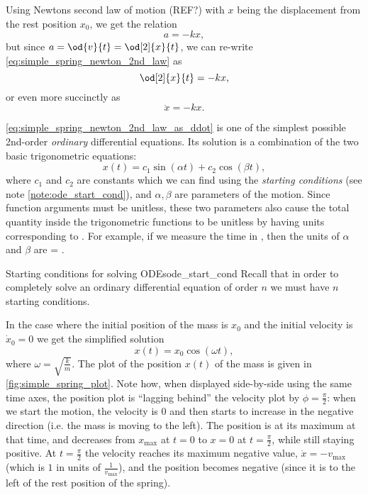 Using Newtons second law of motion (REF?) with $x$ being the displacement from the rest position $x_{0}$, we get the relation
\begin{equation}
  a = -kx,
  \label{eq:simple_spring_newton_2nd_law}
\end{equation}
but since $a = \od{v}{t} = \od[2]{x}{t}$, we can re-write \autoref{eq:simple_spring_newton_2nd_law} as
\begin{equation}
  \od[2]{x}{t} = -kx,
  \label{eq:simple_spring_newton_2nd_law_as_derivative}
\end{equation}
or even more succinctly as
\begin{equation}
  \ddot{x} = -kx.
  \label{eq:simple_spring_newton_2nd_law_as_ddot}
\end{equation}

\autoref{eq:simple_spring_newton_2nd_law_as_ddot} is one of the simplest possible 2nd-order \textit{ordinary} differential equations. Its solution is a combination of the two basic trigonometric equations:
\begin{equation}
  x(t) = c_{1}\sin\left(\alpha t\right) + c_{2}\cos\left(\beta t\right),
  \label{eq:harmonic_solution_ode}
\end{equation}
where $c_{1}$ and $c_{2}$ are constants which we can find using the \textit{starting conditions} (see note \autoref{note:ode_start_cond}), and $\alpha,\beta$ are parameters of the motion. Since function arguments must be unitless, these two parameters also cause the total quantity inside the trigonometric functions to be unitless by having units corresponding to . For example, if we measure the time in \SIe{\second}, then the units of $\alpha$ and $\beta$ are \SIe{\per\second} = \SIe{\hertz}.

\begin{note}{Starting conditions for solving ODEs}{ode_start_cond}
  Recall that in order to completely solve an ordinary differential equation of order $n$ we must have $n$ starting conditions.
\end{note}

In the case where the initial position of the mass is $x_{0}$ and the initial velocity is $\dot{x}_{0}=0$ we get the simplified solution
\begin{equation}
  x(t) = x_{0}\cos(\omega t),
  \label{eq:harmonic_normal_solution}
\end{equation}
where $\omega=\sqrt{\frac{k}{m}}$. The plot of the position $x(t)$ of the mass is given in \autoref{fig:simple_spring_plot}. Note how, when displayed side-by-side using the same time axes, the position plot is \enquote{lagging behind} the velocity plot by $\phi=\frac{\pi}{2}$: when we start the motion, the velocity is $0$ and then starts to increase in the negative direction (i.e. the mass is moving to the left). The position is at its maximum at that time, and decreases from $x_{\max}$ at $t=0$ to $x=0$ at $t=\frac{\pi}{2}$, while still staying positive. At $t=\frac{\pi}{2}$ the velocity reaches its maximum negative value, $\dot{x}=-v_{\max}$ (which is $1$ in units of $\frac{1}{v_{\max}}$), and the position becomes negative (since it is to the left of the rest position of the spring).

